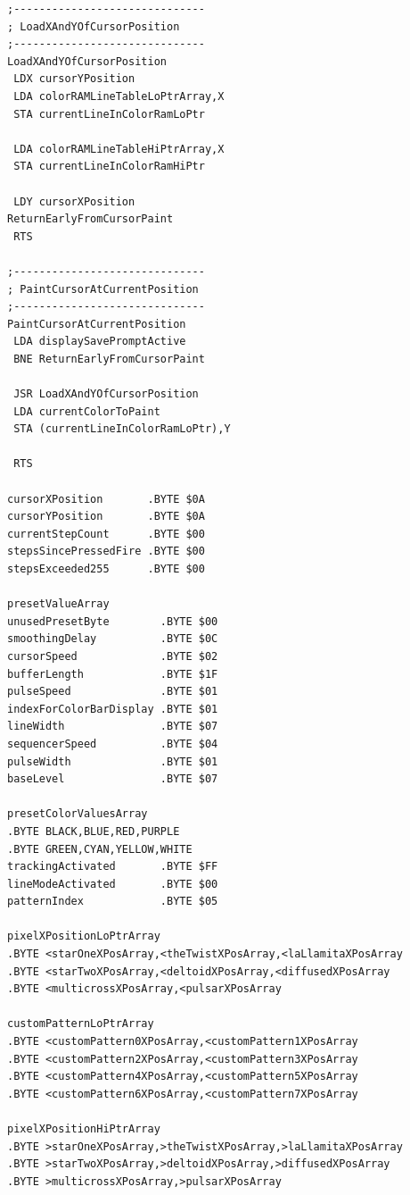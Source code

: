 \hspace{-0.1cm}
\begin{minipage}[b]{0.33\linewidth}
\begin{lrbox}{\mybox}%
\begin{lstlisting}[basicstyle=\ttfamily\tiny]
;------------------------------
; LoadXAndYOfCursorPosition
;------------------------------
LoadXAndYOfCursorPosition
 LDX cursorYPosition
 LDA colorRAMLineTableLoPtrArray,X
 STA currentLineInColorRamLoPtr

 LDA colorRAMLineTableHiPtrArray,X
 STA currentLineInColorRamHiPtr

 LDY cursorXPosition
ReturnEarlyFromCursorPaint
 RTS

;------------------------------
; PaintCursorAtCurrentPosition
;------------------------------
PaintCursorAtCurrentPosition
 LDA displaySavePromptActive
 BNE ReturnEarlyFromCursorPaint

 JSR LoadXAndYOfCursorPosition
 LDA currentColorToPaint
 STA (currentLineInColorRamLoPtr),Y

 RTS

cursorXPosition       .BYTE $0A
cursorYPosition       .BYTE $0A
currentStepCount      .BYTE $00
stepsSincePressedFire .BYTE $00
stepsExceeded255      .BYTE $00

presetValueArray
unusedPresetByte        .BYTE $00
smoothingDelay          .BYTE $0C
cursorSpeed             .BYTE $02
bufferLength            .BYTE $1F
pulseSpeed              .BYTE $01
indexForColorBarDisplay .BYTE $01
lineWidth               .BYTE $07
sequencerSpeed          .BYTE $04
pulseWidth              .BYTE $01
baseLevel               .BYTE $07

presetColorValuesArray
.BYTE BLACK,BLUE,RED,PURPLE
.BYTE GREEN,CYAN,YELLOW,WHITE
trackingActivated       .BYTE $FF
lineModeActivated       .BYTE $00
patternIndex            .BYTE $05

pixelXPositionLoPtrArray
.BYTE <starOneXPosArray,<theTwistXPosArray,<laLlamitaXPosArray
.BYTE <starTwoXPosArray,<deltoidXPosArray,<diffusedXPosArray
.BYTE <multicrossXPosArray,<pulsarXPosArray

customPatternLoPtrArray
.BYTE <customPattern0XPosArray,<customPattern1XPosArray
.BYTE <customPattern2XPosArray,<customPattern3XPosArray
.BYTE <customPattern4XPosArray,<customPattern5XPosArray
.BYTE <customPattern6XPosArray,<customPattern7XPosArray

pixelXPositionHiPtrArray
.BYTE >starOneXPosArray,>theTwistXPosArray,>laLlamitaXPosArray
.BYTE >starTwoXPosArray,>deltoidXPosArray,>diffusedXPosArray
.BYTE >multicrossXPosArray,>pulsarXPosArray


\end{lstlisting}
\end{lrbox}
\end{minipage}
